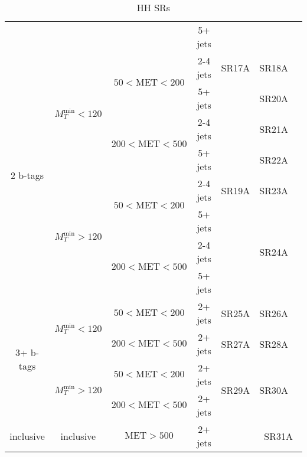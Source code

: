 \documentclass[plain,landscape]{article}
\begin{document}
\begin{table}
\begin{tabular}{|c|c|c|c|c|c|c|c|}
\cline{4-4}
& & & 5+ jets & & \multicolumn{2}{|c|}{} & \\
\cline{1-7}
\multirow{8}{*}{2 b-tags} & \multirow{4}{*}{$M_T^{\textrm{min}} < 120$} & \multirow{2}{*}{ $50 < \textrm{MET} < 200$} & 2-4 jets & SR17A & \multicolumn{2}{|c|}{SR18A} & \\
\cline{4-7}
& & & 5+ jets & \multirow{7}{*}{SR19A} & \multicolumn{2}{|c|}{SR20A} &  \\
\cline{3-4} \cline{6-7}
& &  \multirow{2}{*}{ $200 <  \textrm{MET} < 500$} &  2-4 jets & & \multicolumn{2}{|c|}{SR21A} & \\
\cline{4-4}  \cline{6-7}
& & & 5+ jets & & \multicolumn{2}{|c|}{SR22A} & \\
\cline{2-4} \cline{6-7}
& \multirow{4}{*}{$M_T^{\textrm{min}} > 120$}  & \multirow{2}{*}{ $50 < \textrm{MET} < 200$} & 2-4 jets & &  \multicolumn{2}{|c|}{SR23A} & \\
\cline{4-4} \cline{6-7}
& & & 5+ jets & & \multicolumn{2}{|c|}{\multirow{3}{*}{SR24A}} &  \\
\cline{3-4}
& &  \multirow{2}{*}{ $200 <  \textrm{MET} < 500$} &  2-4 jets & & \multicolumn{2}{|c|}{} & \\
\cline{4-4} 
& & & 5+ jets & & \multicolumn{2}{|c|}{} & \\
\cline{1-7}
\multirow{4}{*}{3+ b-tags} & \multirow{2}{*}{$M_T^{\textrm{min}} < 120$}  & $50 < \textrm{MET} < 200$ & 2+ jets & SR25A & \multicolumn{2}{|c|}{SR26A} & \\
\cline{3-7} 
& & $200 < \textrm{MET} < 500$ & 2+ jets & SR27A & \multicolumn{2}{|c|}{SR28A} &  \\
\cline{2-7}
&  \multirow{2}{*}{$M_T^{\textrm{min}} > 120$}  & $50 < \textrm{MET} < 200$ & 2+ jets & \multirow{2}{*}{SR29A} & \multicolumn{2}{|c|}{\multirow{2}{*}{SR30A}} & \\
\cline{3-4} 
& & $200 < \textrm{MET} < 500$ & 2+ jets &  & \multicolumn{2}{|c|}{} &  \\
\hline
inclusive & inclusive & $\textrm{MET} > 500$ & 2+ jets & \cellcolor{black} & \multicolumn{3}{|c|}{SR31A}  \\
\hline
\end{tabular}
\caption{HH SRs}
\end{table}
\end{document}
